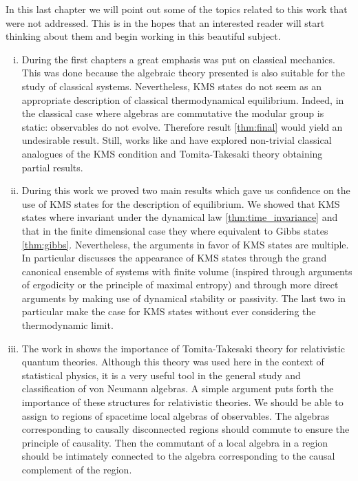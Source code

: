 In this last chapter we will point out some of the topics related to this work that were not addressed. This is in the hopes that an interested reader will start thinking about them and begin working in this beautiful subject.

\begin{enumerate}[(i)]

\item During the first chapters a great emphasis was put on classical mechanics. This was done because the algebraic theory presented is also suitable for the study of classical systems. Nevertheless, KMS states do not seem as an appropriate description of classical thermodynamical equilibrium. Indeed, in the classical case where algebras are commutative the modular group is static: observables do not evolve. Therefore result \ref{thm:final} would yield an undesirable result. Still, works like \cite{Aizenman1977} and \cite{Gallavotti1976} have explored non-trivial classical analogues of the KMS condition and Tomita-Takesaki theory obtaining partial results.

\item During this work we proved two main results which gave us confidence on the use of KMS states for the description of equilibrium. We showed that KMS states where invariant under the dynamical law \ref{thm:time_invariance} and that in the finite dimensional case they where equivalent to Gibbs states \ref{thm:gibbs}. Nevertheless, the arguments in favor of KMS states are multiple. In particular \cite{Haag1992} discusses the appearance of KMS states through the grand canonical ensemble of systems with finite volume (inspired through arguments of ergodicity or the principle of maximal entropy) and through more direct arguments by making use of dynamical stability or passivity. The last two in particular make the case for KMS states without ever considering the thermodynamic limit.

\item The work in \cite{Haag1992} shows the importance of Tomita-Takesaki theory for relativistic quantum theories. Although this theory was used here in the context of statistical physics, it is a very useful tool in the general study and classification of von Neumann algebras. A simple argument puts forth the importance of these structures for relativistic theories. We should be able to assign to regions of spacetime local algebras of observables. The algebras corresponding to causally disconnected regions should commute to ensure the principle of causality. Then the commutant of a local algebra in a region should be intimately connected to the algebra corresponding to the causal complement of the region. 


\end{enumerate}

